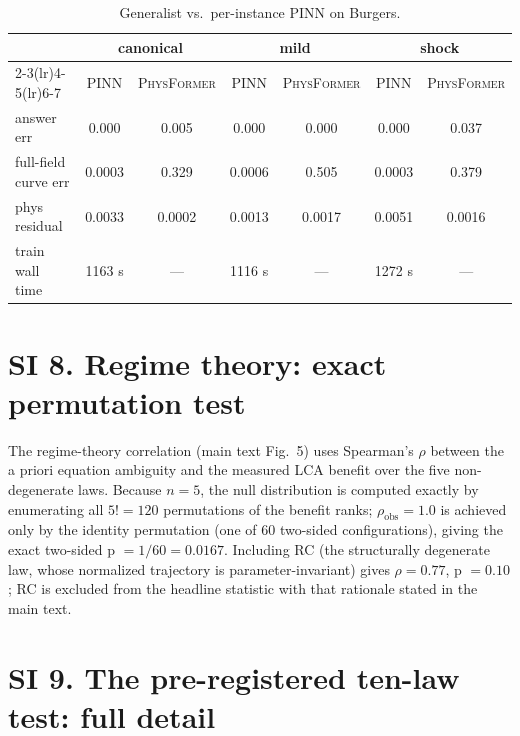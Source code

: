 \documentclass[11pt,a4paper]{article}
\newcommand{\PT}{{\scshape PhysFormer}}
\newcommand{\LCA}{{\scshape LCA}}
\begin{document}
\begin{table}[h]
\centering
\caption{Generalist vs.\ per-instance PINN on Burgers.}
\label{tab:si7}
\small
\begin{tabular}{@{}lcccccc@{}}
\toprule
 & \multicolumn{2}{c}{canonical} & \multicolumn{2}{c}{mild} & \multicolumn{2}{c}{shock} \\
\cmidrule(lr){2-3}\cmidrule(lr){4-5}\cmidrule(lr){6-7}
 & PINN & \PT{} & PINN & \PT{} & PINN & \PT{} \\
\midrule
answer err & 0.000 & 0.005 & 0.000 & 0.000 & 0.000 & 0.037 \\
full-field curve err & 0.0003 & 0.329 & 0.0006 & 0.505 & 0.0003 & 0.379 \\
phys residual & 0.0033 & 0.0002 & 0.0013 & 0.0017 & 0.0051 & 0.0016 \\
train wall time & 1163 s & --- & 1116 s & --- & 1272 s & --- \\
\bottomrule
\end{tabular}
\end{table}

\section*{SI 8. Regime theory: exact permutation test}
\label{si:regime}

The regime-theory correlation (main text Fig.~5) uses Spearman's $\rho$
between the a priori equation ambiguity and the measured \LCA{} benefit over
the five non-degenerate laws. Because $n = 5$, the null distribution is
computed exactly by enumerating all $5! = 120$ permutations of the benefit
ranks; $\rho_{\mathrm{obs}} = 1.0$ is achieved only by the identity
permutation (one of 60 two-sided configurations), giving the exact
two-sided p $= 1/60 = 0.0167$. Including RC (the structurally degenerate
law, whose normalized trajectory is parameter-invariant) gives
$\rho = 0.77$, p $= 0.10$; RC is excluded from the headline statistic with
that rationale stated in the main text.

\section*{SI 9. The pre-registered ten-law test: full detail}
\label{si:oos}
\end{document}
